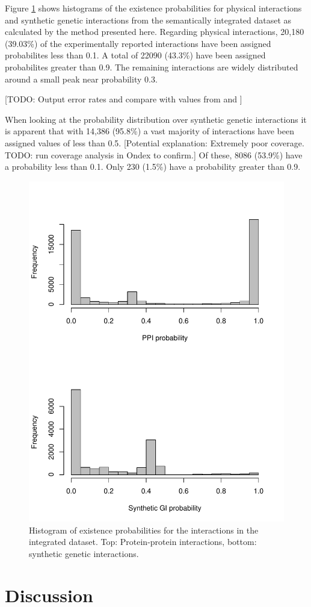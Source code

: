 \documentclass{bioinfo}
\newcommand{\note}[1]{{\color{red}[#1]}}
\begin{document}
Figure \ref{ppi+gi} shows histograms of the existence probabilities for physical interactions and synthetic genetic interactions from the semantically integrated dataset as calculated by the method presented here. Regarding physical interactions, 20,180 (39.03\%) of the experimentally reported interactions have been assigned probabilites less than 0.1. A total of 22090 (43.3\%) have been assigned probabilites greater than 0.9. The remaining interactions are widely distributed around a small peak near probability 0.3.

\note{TODO: Output error rates and compare with values from \citep{dhaeseleer_estimating_2004} and \citep{hart_how_2006}} 

When looking at the probability distribution over synthetic genetic interactions it is apparent that with 14,386 (95.8\%) a vast majority of interactions have been assigned values of less than 0.5. \note{Potential explanation: Extremely poor coverage. TODO: run coverage analysis in Ondex to confirm.} Of these, 8086 (53.9\%) have a probability less than 0.1. Only 230 (1.5\%) have a probability greater than 0.9.



\begin{figure}[!tpb]
\centerline{\includegraphics[width=.5\textwidth]{fig2.pdf}}
\caption{Histogram of existence probabilities for the interactions in the integrated dataset. Top: Protein-protein interactions, bottom: synthetic genetic interactions.}
\label{ppi+gi}
\end{figure}


\section{Discussion}
\end{document}
